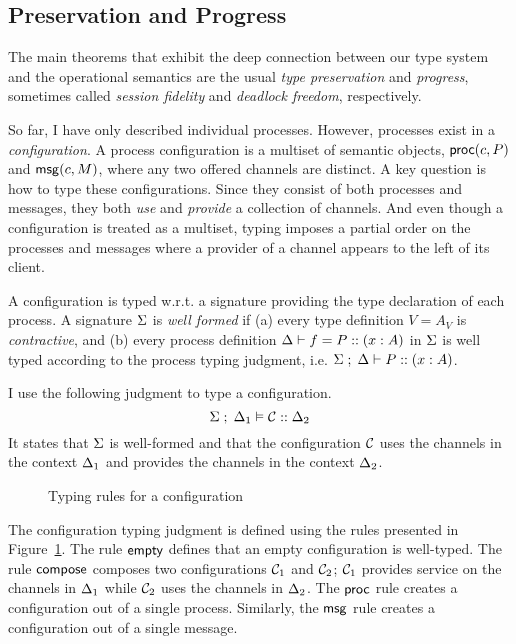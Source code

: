 \subsection{Preservation and Progress}
The main theorems that exhibit the deep connection between our type
system and the operational semantics are the usual \emph{type
  preservation} and \emph{progress}, sometimes called \emph{session
  fidelity} and \emph{deadlock freedom}, respectively.

So far, I have only described individual processes. However, processes
exist in a \emph{configuration}. A process configuration is a multiset
of semantic objects, $\mathsf{proc}(c, P)$ and $\mathsf{msg}(c, M)$, where any
two offered channels are distinct. A key question is how to type these
configurations. Since they consist of both processes and messages, they
both \emph{use} and \emph{provide} a collection of channels.
And even though a configuration is treated as a multiset, typing imposes
a partial order on the processes and messages where a provider of a
channel appears to the left of its client.

A configuration is typed w.r.t. a signature providing the type declaration
of each process.
A signature $\Sigma$ is \emph{well formed} if
(a) every type definition $V = A_V$ is \emph{contractive},
and (b) every process definition
$\Delta \vdash f = P :: (x : A)$ in $\Sigma$
is well typed according to the process typing judgment, i.e.
$\Sigma \; ; \; \Delta \vdash P :: (x : A)$.

I use the following judgment to type a configuration.
\[
\Sigma \; ; \; \Delta_1 \vDash \mathcal{C} :: \Delta_2
\]
It states that $\Sigma$ is well-formed
and that the configuration $\mathcal{C}$
uses the channels in the context $\Delta_1$ and provides
the channels in the context $\Delta_2$.
\begin{figure}[t]
\caption{Typing rules for a configuration}
\label{fig:config_typing}
\end{figure}
The configuration typing judgment is defined using
the rules presented in Figure~\ref{fig:config_typing}.
%
The rule $\mathsf{empty}$ defines that an empty configuration
is well-typed. The rule $\mathsf{compose}$
composes two
configurations $\mathcal{C}_1$ and $\mathcal{C}_2$; $\mathcal{C}_1$ provides
service on the channels in $\Delta_1$ while $\mathcal{C}_2$ uses
the channels in $\Delta_2$. The $\mathsf{proc}$ rule creates a configuration
out of a single process. Similarly, the $\mathsf{msg}$ rule creates a
configuration out of a single message.

